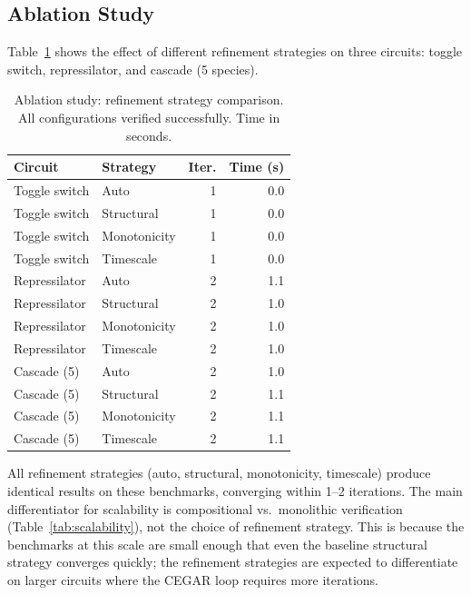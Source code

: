 \documentclass[11pt]{article}
\begin{document}
\subsection{Ablation Study}

Table~\ref{tab:ablation} shows the effect of different refinement
strategies on three circuits: toggle switch, repressilator, and
cascade (5 species).

\begin{table}[t]
\centering
\caption{Ablation study: refinement strategy comparison.
  All configurations verified successfully. Time in seconds.}
\label{tab:ablation}
\small
\begin{tabular}{llrr}
\toprule
\textbf{Circuit} & \textbf{Strategy} & \textbf{Iter.} & \textbf{Time (s)} \\
\midrule
Toggle switch  & Auto            & 1 & 0.0 \\
Toggle switch  & Structural      & 1 & 0.0 \\
Toggle switch  & Monotonicity    & 1 & 0.0 \\
Toggle switch  & Timescale       & 1 & 0.0 \\
Repressilator  & Auto            & 2 & 1.1 \\
Repressilator  & Structural      & 2 & 1.0 \\
Repressilator  & Monotonicity    & 2 & 1.0 \\
Repressilator  & Timescale       & 2 & 1.0 \\
Cascade (5)    & Auto            & 2 & 1.0 \\
Cascade (5)    & Structural      & 2 & 1.1 \\
Cascade (5)    & Monotonicity    & 2 & 1.1 \\
Cascade (5)    & Timescale       & 2 & 1.1 \\
\bottomrule
\end{tabular}
\end{table}

All refinement strategies (auto, structural, monotonicity, timescale)
produce identical results on these benchmarks, converging within
1--2 iterations. The main differentiator for scalability is
compositional vs.\ monolithic verification (Table~\ref{tab:scalability}),
not the choice of refinement strategy. This is because the benchmarks
at this scale are small enough that even the baseline structural
strategy converges quickly; the refinement strategies are expected
to differentiate on larger circuits where the CEGAR loop requires
more iterations.
\end{document}
